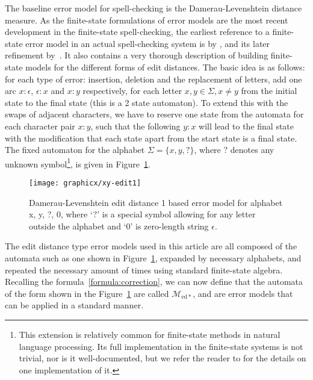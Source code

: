 \documentclass[a4paper,12pt]{article}
\begin{document}
The baseline error model for spell-checking is the Damerau-Levenshtein distance
measure. As the finite-state formulations of error models are the most recent
development in the finite-state spell-checking, the earliest reference to a
finite-state error model in an actual spell-checking system is by
\cite{schulz/2002}, and its later refinement by~\cite{mihov2004fast}.  It also
contains a very thorough description of building finite-state models for the
different forms of edit distances. The basic idea is as follows: for each type of
error: insertion, deletion and the replacement of letters, add one arc
$x:\epsilon$, $\epsilon:x$ and $x:y$ respectively, for each letter $x, y \in
\Sigma, x \neq y$ from the initial state to the final state (this is a 2 state
automaton). To extend this with the swaps of adjacent characters, we have to
reserve one state from the automata for each character pair $x:y$, such that
the following $y:x$ will lead to the final state \cite[]{pirinen/2010/lrec}
with the modification that each state apart from the start state is a final
state. The fixed automaton for the alphabet $\Sigma = \{x, y, ?\}$, where $?$
denotes any unknown symbol\footnote{This extension is relatively common for
    finite-state methods in natural language processing. Its full
    implementation in the finite-state systems is not trivial, nor is it
    well-documented, but we refer the reader to \cite[]{beesley2003finite} for
the details on one implementation of it.}, is given in
Figure~\ref{fig:xy-edit-1}.

\begin{figure}
    \centering
    \texttt{[image: graphicx/xy-edit1]}
    \caption{Damerau-Levenshtein edit distance 1 based error model for
        alphabet {x, y, ?, 0}, where `?' is a special symbol allowing for
        any letter outside the alphabet and `0' is zero-length string
        $\epsilon$.
    \label{fig:xy-edit-1}}
\end{figure}

The edit distance type error models used in this article are all composed of
the automata such as one shown in Figure~\ref{fig:xy-edit-1}, expanded by
necessary alphabets, and repeated the necessary amount of times using standard
finite-state algebra. Recalling the formula~\ref{formula:correction}, we can
now define that the automata of the form shown in the
Figure~\ref{fig:xy-edit-1} are called $\mathcal{M}_{\mathrm{ed*}}$, and are
error models that can be applied in a standard manner.
\end{document}
